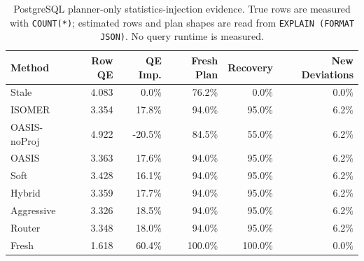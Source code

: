 \begin{table}[t]
  \centering
  \small
  \caption{PostgreSQL planner-only statistics-injection evidence. True rows are measured with \texttt{COUNT(*)}; estimated rows and plan shapes are read from \texttt{EXPLAIN (FORMAT JSON)}. No query runtime is measured.}
  \label{tab:postgres_planner_stats_injection}
  \setlength{\tabcolsep}{4pt}
  \begin{tabular}{lrrrrr}
    \toprule
    Method & Row QE & QE Imp. & Fresh Plan & Recovery & New Deviations \\
    \midrule
    Stale & 4.083 & 0.0\% & 76.2\% & 0.0\% & 0.0\% \\
    ISOMER & 3.354 & 17.8\% & 94.0\% & 95.0\% & 6.2\% \\
    OASIS-noProj & 4.922 & -20.5\% & 84.5\% & 55.0\% & 6.2\% \\
    OASIS & 3.363 & 17.6\% & 94.0\% & 95.0\% & 6.2\% \\
    Soft & 3.428 & 16.1\% & 94.0\% & 95.0\% & 6.2\% \\
    Hybrid & 3.359 & 17.7\% & 94.0\% & 95.0\% & 6.2\% \\
    Aggressive & 3.326 & 18.5\% & 94.0\% & 95.0\% & 6.2\% \\
    Router & 3.348 & 18.0\% & 94.0\% & 95.0\% & 6.2\% \\
    Fresh & 1.618 & 60.4\% & 100.0\% & 100.0\% & 0.0\% \\
    \bottomrule
  \end{tabular}
\end{table}
